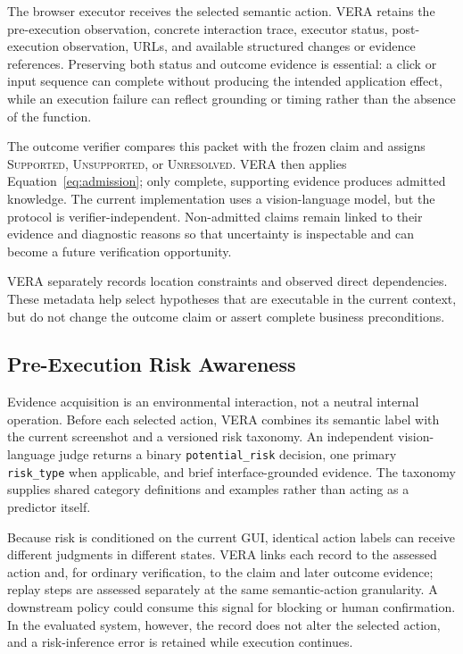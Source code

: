 The browser executor receives the selected semantic action. VERA retains the
pre-execution observation, concrete interaction trace, executor status,
post-execution observation, URLs, and available structured changes or evidence
references. Preserving both status and outcome evidence is essential: a click
or input sequence can complete without producing the intended application
effect, while an execution failure can reflect grounding or timing rather than
the absence of the function.

The outcome verifier compares this packet with the frozen claim and assigns
\textsc{Supported}, \textsc{Unsupported}, or \textsc{Unresolved}. VERA then
applies Equation~\ref{eq:admission}; only complete, supporting evidence produces
admitted knowledge. The current implementation uses a vision-language model,
but the protocol is verifier-independent. Non-admitted claims remain linked to
their evidence and diagnostic reasons so that uncertainty is inspectable and
can become a future verification opportunity.

VERA separately records location constraints and observed direct dependencies.
These metadata help select hypotheses that are executable in the current
context, but do not change the outcome claim or assert complete business
preconditions.

\subsection{Pre-Execution Risk Awareness}

Evidence acquisition is an environmental interaction, not a neutral internal
operation. Before each selected action, VERA combines its semantic label with
the current screenshot and a versioned risk taxonomy. An independent
vision-language judge returns a binary \texttt{potential\_risk} decision, one
primary \texttt{risk\_type} when applicable, and brief interface-grounded
evidence. The taxonomy supplies shared category definitions and examples rather
than acting as a predictor itself.

Because risk is conditioned on the current GUI, identical action labels can
receive different judgments in different states. VERA links each record to the
assessed action and, for ordinary verification, to the claim and later outcome
evidence; replay steps are assessed separately at the same semantic-action
granularity. A downstream policy could consume this signal for blocking or
human confirmation. In the evaluated system, however, the record does not
alter the selected action, and a risk-inference error is retained while
execution continues.

